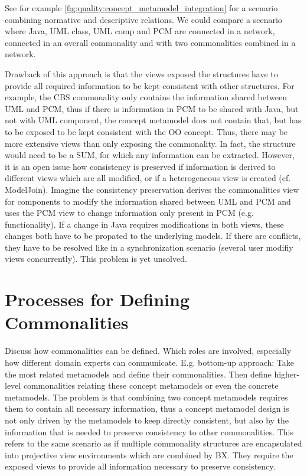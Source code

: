 See for example \autoref{fig:quality:concept_metamodel_integration} for a scenario combining normative and descriptive relations. We could compare a scenario where Java, UML class, UML comp and PCM are connected in a network, connected in an overall commonality and with two commonalities combined in a network.

Drawback of this approach is that the views exposed the structures have to provide all required information to be kept consistent with other structures. For example, the CBS commonality only contains the information shared between UML and PCM, thus if there is information in PCM to be shared with Java, but not with UML component, the concept metamodel does not contain that, but has to be exposed to be kept consistent with the OO concept. Thus, there may be more extensive views than only exposing the commonality. In fact, the structure would need to be a SUM, for which any information can be extracted. However, it is an open issue how consistency is preserved if information is derived to different views which are all modified, or if a heterogeneous view is created (cf. ModelJoin). Imagine the consistency preservation derives the commonalities view for components to modify the information shared between UML and PCM and uses the PCM view to change information only present in PCM (e.g. functionality). If a change in Java requires modifications in both views, these changes both have to be propated to the underlying models. If there are conflicts, they have to be resolved like in a synchronization scenario (several user modifiy views concurrently). This problem is yet unsolved.



\section{Processes for Defining Commonalities}

Discuss how commonalities can be defined. Which roles are involved, especially how different domain experts can communicate. E.g. bottom-up approach: Take the most related metamodels and define their commonalities. Then define higher-level commonalities relating these concept metamodels or even the concrete metamodels. 
The problem is that combining two concept metamodels requires them to contain all necessary information, thus a concept metamodel design is not only driven by the metamodels to keep directly consistent, but also by the information that is needed to preserve consistency to other commonalities. This refers to the same scenario as if multiple commonality structures are encapsulated into projective view environments which are combined by BX. They require the exposed views to provide all information necessary to preserve consistency.